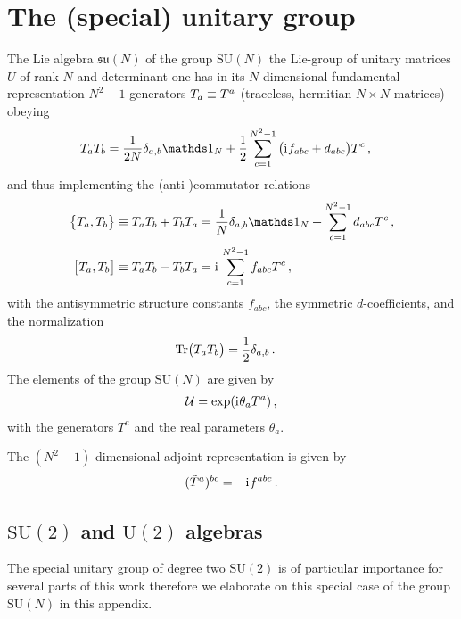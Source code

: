 \section{The (special) unitary group}\label{app:SUN}
The Lie algebra $\mathfrak{su}(N)$ of the group $\mathrm{SU}(N)$ \dash{} the Lie-group of unitary matrices $U$ of rank $N$ and determinant one \dash{} has in its $N$-dimensional fundamental representation $N^2-1$ generators $T_{a}\equiv T^{a}$ (traceless, hermitian $N\times N$ matrices) obeying
\begin{align}
	\suNt{a}\suNt{b} &= \frac{1}{2N}\delta_{a,b}\Id_N + \frac{1}{2}\sum_{c=1}^{N^2-1}\big(\iu f_{a b c}+d_{a b c}\big)\suNtup{c}  \, ,\label{eq:SUNTdef}
\end{align}
and thus implementing the (anti-)commutator relations
\begin{align}
	\big\{\suNt{a},\suNt{b}\big\}&\equiv \suNt{a}\suNt{b} + \suNt{b}\suNt{a} = \frac{1}{N}\delta_{a,b} \Id_N+\sum_{c=1}^{N^2-1}d_{a b c}\suNtup{c} \, ,\\
	\big[\suNt{a},\suNt{b}\big]&\equiv \suNt{a}\suNt{b} - \suNt{b}\suNt{a} = \iu\mkern2mu\sum_{c=1}^{N^2-1}f_{a b c}\suNtup{c} \, ,
\end{align}
with the antisymmetric structure constants $f_{a b c}$, the symmetric $d$-coefficients, and the normalization
\begin{align}
	\operatorname{Tr}\!\big(T_{a}T_{b}\big) &= \frac{1}{2}\delta_{a,b} \, .
\end{align}
The elements of the group $\mathrm{SU}(N)$ are given by
\begin{align}
	\mathcal{U}{}=\exp(\mathrm{i}\mkern1mu \theta_a T^{a}) \, ,
\end{align}
with the generators $T^a$ and the real parameters $\theta_a$.\bigskip

The $(N^2-1)$-dimensional adjoint representation is given by
\begin{align}
	(\tilde{T}^{a})^{b c}=-\mathrm{i}\mkern1mu f^{a b c} \, .
\end{align}

\subsection{\texorpdfstring{$\mathrm{SU}(2)$}{SU(2)} and \texorpdfstring{$\mathrm{U}(2)$}{U(2)} algebras}\label{app:SU2}
The special unitary group of degree two $\mathrm{SU}(2)$ is of particular importance for several parts of this work therefore we elaborate on this special case of the group $\mathrm{SU}(N)$ in this appendix.\bigskip

